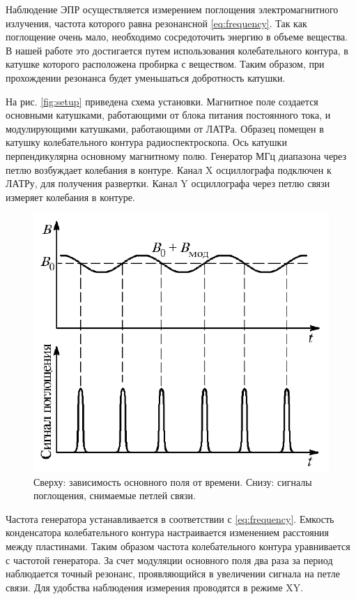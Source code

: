 \documentclass[a4paper, 12pt]{article} %
\begin{document}
	Наблюдение ЭПР осуществляется измерением поглощения электромагнитного излучения, частота которого равна резонансной \eqref{eq:frequency}. Так как поглощение очень мало, необходимо сосредоточить энергию в объеме вещества. В нашей работе это достигается путем использования колебательного контура, в катушке которого расположена пробирка с веществом. Таким образом, при прохождении резонанса будет уменьшаться добротность катушки.
	
	На рис. \ref{fig:setup} приведена схема установки. Магнитное поле создается основными катушками, работающими от блока питания постоянного тока, и модулирующими катушками, работающими от ЛАТРа. Образец помещен в катушку колебательного контура радиоспектроскопа. Ось катушки перпендикулярна основному магнитному полю. Генератор МГц диапазона через петлю возбуждает колебания в контуре. Канал X осциллографа подключен к ЛАТРу, для получения развертки. Канал Y осциллографа через петлю связи измеряет колебания в контуре.
	
	\begin{figure}[h!]
		\centering
		\includegraphics[scale=0.7]{res/signal.png}
		\caption{\centering
			 	 Сверху: зависимость основного поля от времени.\newline
			 	 Снизу: сигналы поглощения, снимаемые петлей связи.}
		\label{fig:metal}
	\end{figure}
	
	Частота генератора устанавливается в соответствии с \eqref{eq:frequency}. Емкость конденсатора колебательного контура настраивается изменением расстояния между пластинами. Таким образом частота колебательного контура уравнивается с частотой генератора. За счет модуляции основного поля два раза за период наблюдается точный резонанс, проявляющийся в увеличении сигнала на петле связи. Для удобства наблюдения измерения проводятся в режиме XY.
	
\end{document}
